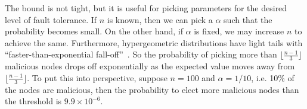 The bound is not tight, but it is useful for picking parameters for the desired level of fault tolerance.
If $n$ is known, then we can pick a $\alpha$ such that the probability becomes small.
On the other hand, if $\alpha$ is fixed, we may increase $n$ to achieve the same.
Furthermore, hypergeometric distributions have light tails with ``faster-than-exponential fall-off''~\cite{skala2013hypergeometric}.
So the probability of picking more than $\lfloor \frac{n-1}{3} \rfloor$ malicious nodes drops off exponentially as the expected value moves away from $\lfloor \frac{n-1}{3} \rfloor$.
To put this into perspective,
suppose $n = 100$ and $\alpha = 1/10$, i.e. 10\% of the nodes are malicious,
then the probability to elect more malicious nodes than the threshold is $9.9 \times 10^{-6}$.



